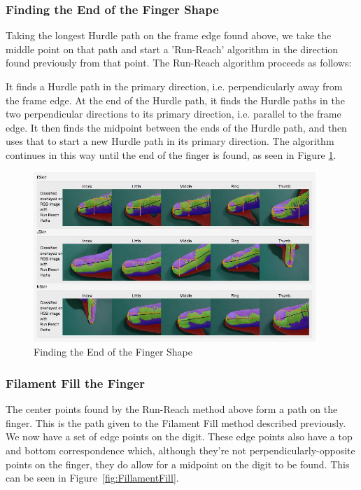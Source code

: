 \subsubsection{Finding the End of the Finger Shape}\label{sec:FindingTheEndOfTheFingerShape}
Taking the longest Hurdle path on the frame edge found above, we take the middle point on that path and start a 'Run-Reach' algorithm in the direction found previously from that point. The Run-Reach algorithm proceeds as follows:

It finds a Hurdle path in the primary direction, i.e. perpendicularly away from the frame edge. At the end of the Hurdle path, it finds the Hurdle paths in the two perpendicular directions to its primary direction, i.e. parallel to the frame edge. It then finds the midpoint between the ends of the Hurdle path, and then uses that to start a new Hurdle path in its primary direction. The algorithm continues in this way until the end of the finger is found, as seen in Figure \ref{fig:FindingTheTip}.

\begin{figure}[h!]
  \centering
    \includegraphics[width=0.95\textwidth]{Chapter4/Figs/FindingTheTip.jpg}
    \caption{Finding the End of the Finger Shape}\label{fig:FindingTheTip}
\end{figure}



\subsubsection{Filament Fill the Finger}\label{sec:FilamentFillTheFinger}
The center points found by the Run-Reach method above form a path on the finger. This is the path given to the Filament Fill method described previously. We now have a set of edge points on the digit. These edge points also have a top and bottom correspondence which, although they're not perpendicularly-opposite points on the finger, they do allow for a midpoint on the digit to be found. This can be seen in Figure~\ref{fig:FillamentFill}.

